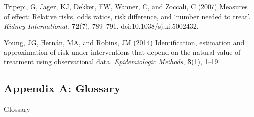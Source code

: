\documentclass[
  single column]{article}
\newlength{\cslhangindent}
\newenvironment{CSLReferences}[2] %
 {\begin{list}{}{%
  \setlength{\itemindent}{0pt}
  \setlength{\leftmargin}{0pt}
  \setlength{\parsep}{0pt}
  \ifodd #1
   \setlength{\leftmargin}{\cslhangindent}
   \setlength{\itemindent}{-1\cslhangindent}
  \fi
  \setlength{\itemsep}{#2\baselineskip}}}
 {\end{list}}
\begin{document}
\begin{CSLReferences}{1}{0}
Tripepi, G, Jager, KJ, Dekker, FW, Wanner, C, and Zoccali, C (2007)
Measures of effect: Relative risks, odds ratios, risk difference, and
{`}number needed to treat{'}. \emph{Kidney International},
\textbf{72}(7), 789--791.
doi:\href{https://doi.org/10.1038/sj.ki.5002432}{10.1038/sj.ki.5002432}.

Young, JG, Hernán, MA, and Robins, JM (2014) Identification, estimation
and approximation of risk under interventions that depend on the natural
value of treatment using observational data. \emph{Epidemiologic
Methods}, \textbf{3}(1), 1--19.

\end{CSLReferences}

\newpage{}

\subsection{Appendix A: Glossary}\label{id-app-a}

\begin{table}

\caption{\label{tbl-experiments}Glossary}

\centering{

\glossaryTerms

}

\end{table}%
\end{document}
